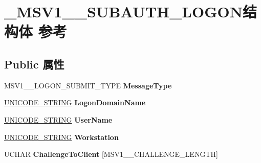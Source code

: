 \hypertarget{struct___m_s_v1__0___s_u_b_a_u_t_h___l_o_g_o_n}{}\section{\+\_\+\+M\+S\+V1\+\_\+\_\+\+S\+U\+B\+A\+U\+T\+H\+\_\+\+L\+O\+G\+O\+N结构体 参考}
\label{struct___m_s_v1__0___s_u_b_a_u_t_h___l_o_g_o_n}
\subsection*{Public 属性}
\begin{DoxyCompactItemize}
\item 
\mbox{\label{struct___m_s_v1__0___s_u_b_a_u_t_h___l_o_g_o_n_adb25058cfad973d9208079495e494e24}} 
M\+S\+V1\+\_\+\_\+\+L\+O\+G\+O\+N\+\_\+\+S\+U\+B\+M\+I\+T\+\_\+\+T\+Y\+PE {\bfseries Message\+Type}
\item 
\mbox{\label{struct___m_s_v1__0___s_u_b_a_u_t_h___l_o_g_o_n_acbb37b89b3de833c5f369f3d56a23888}} 
\hyperlink{struct___u_n_i_c_o_d_e___s_t_r_i_n_g}{U\+N\+I\+C\+O\+D\+E\+\_\+\+S\+T\+R\+I\+NG} {\bfseries Logon\+Domain\+Name}
\item 
\mbox{\label{struct___m_s_v1__0___s_u_b_a_u_t_h___l_o_g_o_n_a176a8d43ad494b05db31f782a9814890}} 
\hyperlink{struct___u_n_i_c_o_d_e___s_t_r_i_n_g}{U\+N\+I\+C\+O\+D\+E\+\_\+\+S\+T\+R\+I\+NG} {\bfseries User\+Name}
\item 
\mbox{\label{struct___m_s_v1__0___s_u_b_a_u_t_h___l_o_g_o_n_a782e0c0a1a285977c45d1421e907c9aa}} 
\hyperlink{struct___u_n_i_c_o_d_e___s_t_r_i_n_g}{U\+N\+I\+C\+O\+D\+E\+\_\+\+S\+T\+R\+I\+NG} {\bfseries Workstation}
\item 
\mbox{\label{struct___m_s_v1__0___s_u_b_a_u_t_h___l_o_g_o_n_a77ed6ff9386d86f14d85c452857ada64}} 
U\+C\+H\+AR {\bfseries Challenge\+To\+Client} \mbox{[}M\+S\+V1\+\_\+\_\+\+C\+H\+A\+L\+L\+E\+N\+G\+E\+\_\+\+L\+E\+N\+G\+TH\mbox{]}
\item 

\end{DoxyCompactItemize}
